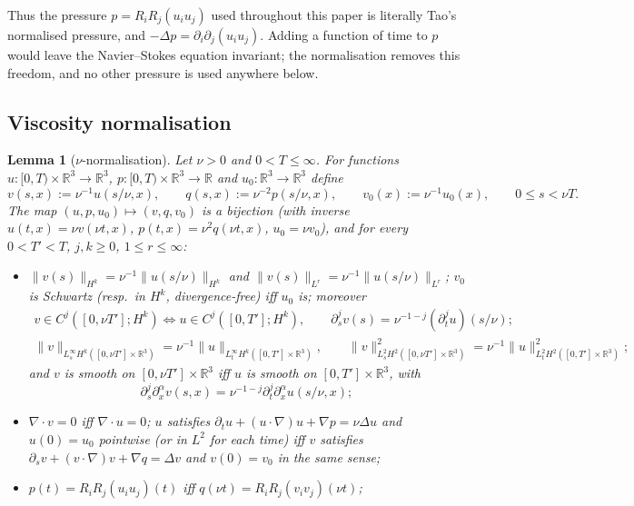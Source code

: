 \documentclass[11pt]{article}
\newtheorem{lemma}[theorem]{Lemma}
\theoremstyle{definition}
\theoremstyle{plain}
\newcommand{\R}{\mathbb R}
\newcommand{\norm}[1]{\lVert #1\rVert}
\begin{document}
Thus the pressure $p=R_iR_j(u_iu_j)$ used throughout this paper is
literally Tao's normalised pressure, and $-\Delta p=\partial_i\partial_j
(u_iu_j)$.  Adding a function of time to $p$ would leave the Navier--Stokes
equation invariant; the normalisation removes this freedom, and no other
pressure is used anywhere below.

\subsection{Viscosity normalisation}

\begin{lemma}[$\nu$-normalisation]\label{lem:nu-scaling}
Let $\nu>0$ and $0<T\leq\infty$.  For functions $u:[0,T)\times\R^3\to\R^3$,
$p:[0,T)\times\R^3\to\R$ and $u_0:\R^3\to\R^3$ define
\begin{equation}\label{eq:nu-map}
 v(s,x):=\nu^{-1}u(s/\nu,x),\qquad q(s,x):=\nu^{-2}p(s/\nu,x),
 \qquad v_0(x):=\nu^{-1}u_0(x),\qquad 0\leq s<\nu T .
\end{equation}
The map $(u,p,u_0)\mapsto(v,q,v_0)$ is a bijection (with inverse
$u(t,x)=\nu v(\nu t,x)$, $p(t,x)=\nu^2q(\nu t,x)$, $u_0=\nu v_0$), and for
every $0<T'<T$, $j,k\geq0$, $1\leq r\leq\infty$:
\begin{itemize}
\item[(a)] $\norm{v(s)}_{H^k}=\nu^{-1}\norm{u(s/\nu)}_{H^k}$ and
$\norm{v(s)}_{L^r}=\nu^{-1}\norm{u(s/\nu)}_{L^r}$; $v_0$ is Schwartz
(resp.\ in $H^k$, divergence-free) iff $u_0$ is; moreover
\begin{gather*}
 v\in C^j([0,\nu T'];H^k)\iff u\in C^j([0,T'];H^k),\qquad
 \partial_s^jv(s)=\nu^{-1-j}(\partial_t^ju)(s/\nu);\\
 \norm v_{L^\infty_sH^k([0,\nu T']\times\R^3)}
 =\nu^{-1}\norm u_{L^\infty_tH^k([0,T']\times\R^3)},\qquad
 \norm v_{L^2_sH^2([0,\nu T']\times\R^3)}^2
 =\nu^{-1}\norm u_{L^2_tH^2([0,T']\times\R^3)}^2 ;
\end{gather*}
and $v$ is smooth on $[0,\nu T']\times\R^3$ iff $u$ is smooth on
$[0,T']\times\R^3$, with
\[
 \partial_s^j\partial_x^\alpha v(s,x)
 =\nu^{-1-j}\partial_t^j\partial_x^\alpha u(s/\nu,x);
\]
\item[(b)] $\nabla\cdot v=0$ iff $\nabla\cdot u=0$; $u$ satisfies
$\partial_tu+(u\cdot\nabla)u+\nabla p=\nu\Delta u$ and $u(0)=u_0$
pointwise (or in $L^2$ for each time) iff $v$ satisfies
$\partial_sv+(v\cdot\nabla)v+\nabla q=\Delta v$ and $v(0)=v_0$ in the same
sense;
\item[(c)] $p(t)=R_iR_j(u_iu_j)(t)$ iff $q(\nu t)=R_iR_j(v_iv_j)(\nu t)$;

\end{itemize}
\end{lemma}
\end{document}
